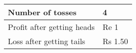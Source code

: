 \begin{tabular}{|l|l|}\hline
Number of tosses	&4\\\hline
Profit after getting heads	&Re 1\\\hline
Loss after getting tails	&Rs 1.50\\\hline
\end{tabular}
